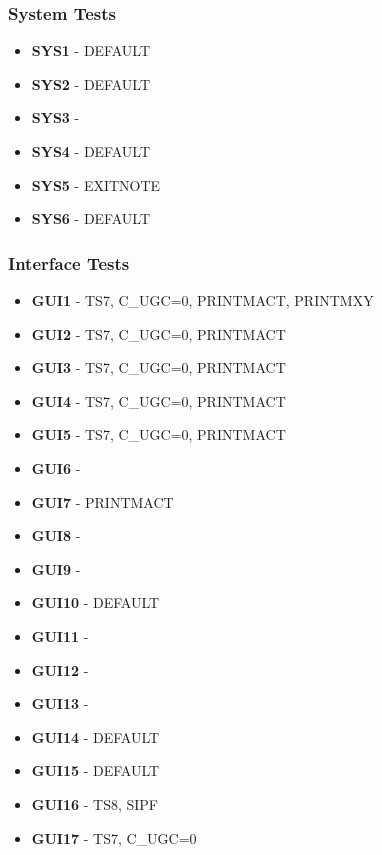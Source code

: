 \subsubsection{System Tests}
\begin{itemize}
\footnotesize
\item \textbf{SYS1} - DEFAULT
\item \textbf{SYS2} - DEFAULT
\item \textbf{SYS3} - 
\item \textbf{SYS4} - DEFAULT
\item \textbf{SYS5} - EXITNOTE
\item \textbf{SYS6} - DEFAULT
\end{itemize}

\subsubsection{Interface Tests}
\begin{itemize}
\footnotesize
\item \textbf{GUI1} - TS7, C\_UGC=0, PRINTMACT, PRINTMXY
\item \textbf{GUI2} - TS7, C\_UGC=0, PRINTMACT
\item \textbf{GUI3} - TS7, C\_UGC=0, PRINTMACT
\item \textbf{GUI4} - TS7, C\_UGC=0, PRINTMACT
\item \textbf{GUI5} - TS7, C\_UGC=0, PRINTMACT
\item \textbf{GUI6} - 
\item \textbf{GUI7} - PRINTMACT
\item \textbf{GUI8} - 
\item \textbf{GUI9} - 
\item \textbf{GUI10} - DEFAULT
\item \textbf{GUI11} - 
\item \textbf{GUI12} - 
\item \textbf{GUI13} - 
\item \textbf{GUI14} - DEFAULT
\item \textbf{GUI15} - DEFAULT
\item \textbf{GUI16} - TS8, SIPF
\item \textbf{GUI17} - TS7, C\_UGC=0
\end{itemize}

